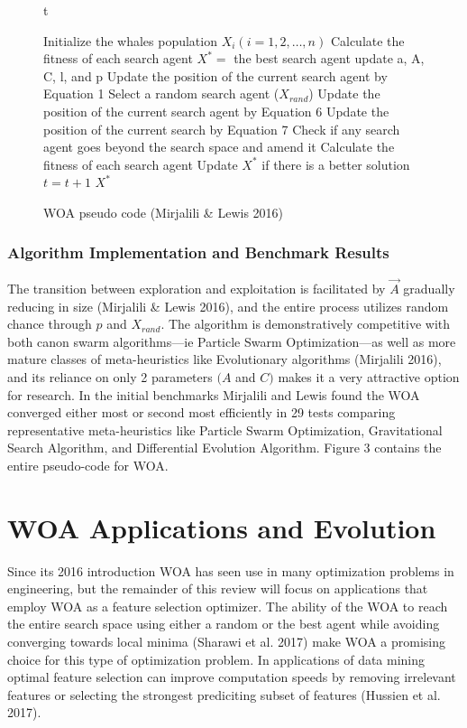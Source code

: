 \documentclass[11pt]{article}
\begin{document}
\begin{figure}{t}
	\caption{WOA pseudo code (Mirjalili \& Lewis 2016)}
	\begin{algorithm}[H]
		\scriptsize
		\begin{algorithmic}[1]
			\STATE Initialize the whales population $X_i(i = 1,2, \dots, n)$
			\STATE Calculate the fitness of each search agent
			\STATE $X^* = $ the best search agent
					\STATE update a, A, C, l, and p
							\STATE Update the position of the current search agent by Equation 1
						\ELSE
							\STATE Select a random search agent ($X_{rand}$)
							\STATE Update the position of the current search agent by Equation 6
						\ENDIF
					\ELSE
						\STATE Update the position of the current search by Equation 7
					\ENDIF
				\ENDFOR
				\STATE Check if any search agent goes beyond the search space and amend it
				\STATE Calculate the fitness of each search agent
				\STATE Update $X^*$ if there is a better solution
				\STATE $t = t+1$
			\ENDWHILE
			\STATE \RETURN $X^*$ 
		\end{algorithmic}
	\end{algorithm}
\end{figure}


\subsubsection*{Algorithm Implementation and Benchmark Results}
The transition between exploration and exploitation is facilitated by $\vec{A}$ gradually reducing in size (Mirjalili \& Lewis 2016), and the entire process utilizes random chance through $p$ and $X_{rand}$.
The algorithm is demonstratively competitive with both canon swarm algorithms---ie Particle Swarm Optimization---as well as more mature classes of meta-heuristics like Evolutionary algorithms (Mirjalili 2016), and its reliance on only 2 parameters $(A$ and $C)$ makes it a very attractive option for research.
In the initial benchmarks Mirjalili and Lewis found the WOA converged either most or second most efficiently in 29 tests comparing representative meta-heuristics like Particle Swarm Optimization, Gravitational Search Algorithm, and Differential Evolution Algorithm.
Figure 3 contains the entire pseudo-code for WOA.

\section*{WOA Applications and Evolution}
Since its 2016 introduction WOA has seen use in many optimization problems in engineering, but the remainder of this review will focus on applications that employ WOA as a feature selection optimizer.
The ability of the WOA to reach the entire search space using either a random or the best agent while avoiding converging towards local minima (Sharawi et al. 2017) make WOA a promising choice for this type of optimization problem.
In applications of data mining optimal feature selection can improve computation speeds by removing irrelevant features or selecting the strongest prediciting subset of features (Hussien et al. 2017).
\end{document}
